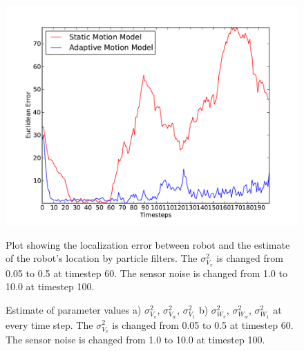 \documentclass[12pt]{dalcsthesis}
\begin{document}
\begin{figure}[!ht]
  \centering
     {\includegraphics[height = 3.0 in]{./plots/200_005_05_s_10_100_100_traj_3_trial_1.pdf}}
  \caption{\label{fig-different sensor noise} Plot showing the localization error between robot and the estimate of the robot's location by particle filters. The $\sigma_{V_{v}}^{2}$ is changed from 0.05 to 0.5 at timestep 60. The sensor noise is changed from 1.0 to 10.0 at timestep 100. }
\end{figure}

\begin{figure}[!ht]
  \centering
  \caption{\label{fig-different sensor noise motion model trans} Estimate of parameter values a) $\sigma_{V_{v}}^{2}$, $\sigma_{V_{w}}^{2}$,  $\sigma_{V_{1}}^{2}$ b) $\sigma_{W_{v}}^{2}$, $\sigma_{W_{w}}^{2}$, $\sigma_{W_{1}}^{2}$ at every time step. The $\sigma_{V_{v}}^{2}$ is changed from 0.05 to 0.5 at timestep 60. The sensor noise is changed from 1.0 to 10.0 at timestep 100.}
\end{figure}
\end{document}
